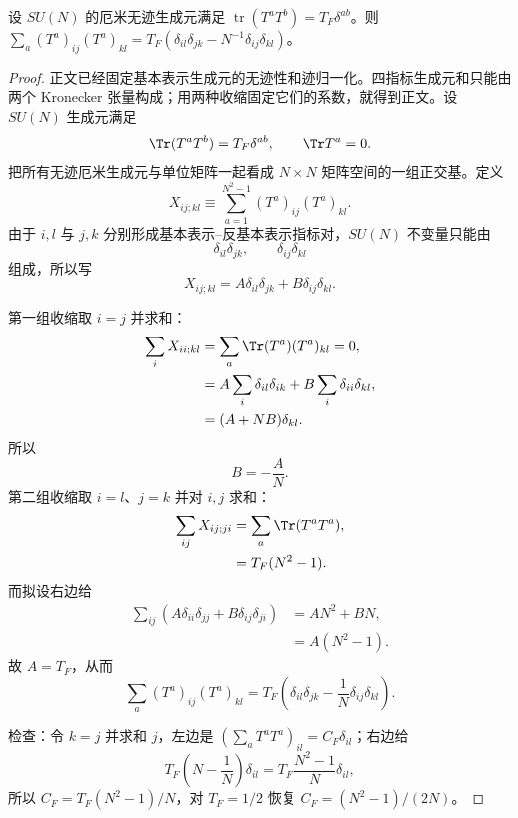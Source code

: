 \begin{lemma}[基本表示的完整性恒等式]
设 $SU(N)$ 的厄米无迹生成元满足 $\operatorname{tr}(T^aT^b)=T_F\delta^{ab}$。则 $\sum_a(T^a)_{ij}(T^a)_{kl}=T_F(\delta_{il}\delta_{jk}-N^{-1}\delta_{ij}\delta_{kl})$。
\end{lemma}
\begin{proof}
正文已经固定基本表示生成元的无迹性和迹归一化。四指标生成元和只能由两个 Kronecker 张量构成；用两种收缩固定它们的系数，就得到正文。设 $SU(N)$ 生成元满足
\begin{equation*}
 \Tr(T^aT^b)=T_F\delta^{ab},
 \qquad \Tr T^a=0.
\end{equation*}
把所有无迹厄米生成元与单位矩阵一起看成 $N\times N$ 矩阵空间的一组正交基。定义
\begin{equation*}
 X_{ij;kl}\equiv\sum_{a=1}^{N^2-1}(T^a)_{ij}(T^a)_{kl}.
\end{equation*}
由于 $i,l$ 与 $j,k$ 分别形成基本表示--反基本表示指标对，$SU(N)$ 不变量只能由
\begin{equation*}
 \delta_{il}\delta_{jk},
 \qquad
 \delta_{ij}\delta_{kl}
\end{equation*}
组成，所以写
\begin{equation*}
 X_{ij;kl}=A\delta_{il}\delta_{jk}+B\delta_{ij}\delta_{kl}.
\end{equation*}

第一组收缩取 $i=j$ 并求和：
\begin{align*}
 \sum_iX_{ii;kl}
 &=\sum_a\Tr(T^a)(T^a)_{kl}=0,\\
 &=A\sum_i\delta_{il}\delta_{ik}
 +B\sum_i\delta_{ii}\delta_{kl},\\
 &=(A+NB)\delta_{kl}.
\end{align*}
所以
\begin{equation*}
 B=-\frac AN.
\end{equation*}
第二组收缩取 $i=l$、$j=k$ 并对 $i,j$ 求和：
\begin{align*}
 \sum_{ij}X_{ij;ji}
 &=\sum_a\Tr(T^aT^a),\\
 &=T_F(N^2-1).
\end{align*}
而拟设右边给
\begin{align*}
 \sum_{ij}
 \left(A\delta_{ii}\delta_{jj}+B\delta_{ij}\delta_{ji}\right)
 &=AN^2+BN,\\
 &=A(N^2-1).
\end{align*}
故 $A=T_F$，从而
\begin{equation*}
 {
 \sum_a(T^a)_{ij}(T^a)_{kl}
 =T_F\left(
 \delta_{il}\delta_{jk}
 -\frac1N\delta_{ij}\delta_{kl}
 \right).}
\end{equation*}

检查：令 $k=j$ 并求和 $j$，左边是 $(\sum_aT^aT^a)_{il}=C_F\delta_{il}$；右边给
\begin{equation*}
 T_F\left(N-\frac1N\right)\delta_{il}
 =T_F\frac{N^2-1}{N}\delta_{il},
\end{equation*}
所以 $C_F=T_F(N^2-1)/N$，对 $T_F=1/2$ 恢复 $C_F=(N^2-1)/(2N)$。
\end{proof}


